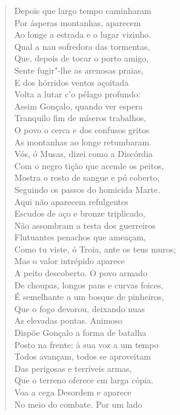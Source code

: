 \begin{verse}
Depois que largo tempo caminharam\\
Por ásperas montanhas, aparecem\\
Ao longe a estrada e o lugar vizinho.\\
Qual a nau sofredora das tormentas,\\
Que, depois de tocar o porto amigo,\\
Sente fugir"-lhe as arenosas praias,\\
E dos hórridos ventos açoitada\\
Volta a lutar c'o pélago profundo:\\
Assim Gonçalo, quando ver espera\\
Tranquilo fim de míseros trabalhos,\\
O povo o cerca e dos confusos gritos\\
As montanhas ao longe retumbaram.\\
Vós, ó Musas, dizei como a Discórdia\\
Com o negro tição que acende os peitos,\\
Mostra o rosto de sangue e pó coberto,\\
Seguindo os passos do homicida Marte.\\		\index{\Marte}
Aqui não aparecem refulgentes\\
Escudos de aço e bronze triplicado,\\
Não assombram a testa dos guerreiros\\
Flutuantes penachos que ameaçam,\\
Como tu viste, ó Troia, ante os teus muros;\\
Mas o valor intrépido aparece\\
A peito descoberto. O povo armado\\
De choupas, longos paus e curvas foices,\\
É semelhante a um bosque de pinheiros,\\
Que o fogo devorou, deixando nuas\\
As elevadas pontas. Animoso\\ 
Dispõe Gonçalo a forma de batalha\\
Posto na frente: à sua voz a um tempo\\
Todos avançam, todos se aproveitam\\
Das perigosas e terríveis armas,\\
Que o terreno oferece em larga cópia.\\
Voa a cega Desordem e aparece\\
No meio do combate. Por um lado\\

\end{verse}

